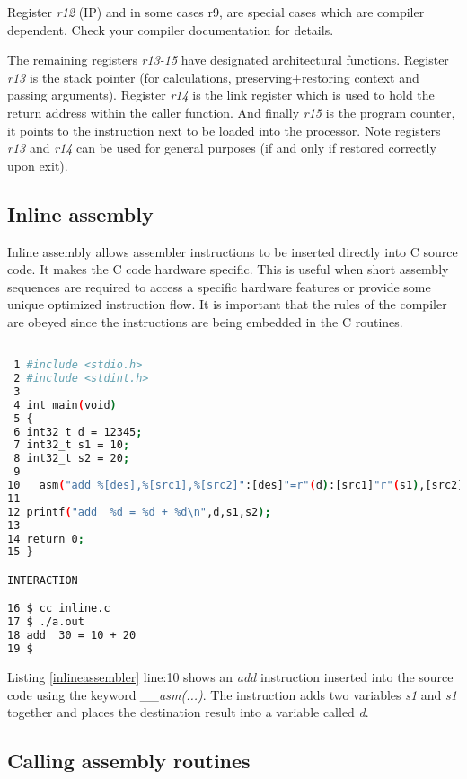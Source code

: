 Register \textit{r12} (IP) and in some cases r9, are special cases which are compiler dependent. Check your compiler documentation for details. 

The remaining registers \textit{r13-15} have designated architectural functions. Register \textit{r13} is the stack pointer (for calculations, preserving+restoring context and passing arguments). Register \textit{r14} is the link register which is used to hold the return address within the caller function. And finally \textit{r15} is the program counter, it points to the instruction next to be loaded into the processor. Note registers \textit{r13} and \textit{r14} can be used for general purposes (if and only if restored correctly upon exit).

\subsection{Inline assembly} \label{inlineass} 

Inline assembly allows assembler instructions to be inserted directly into C source code. It makes the C code hardware specific. This is useful when short assembly sequences are required to access a specific hardware features or provide some unique optimized instruction flow. It is important that the rules of the compiler are obeyed since the instructions are being embedded in the C routines.

\begin{lstlisting}[language=bash,showstringspaces=false,caption={File: inline.c},captionpos=b,label=inlineassembler]

 1 #include <stdio.h>
 2 #include <stdint.h>
 3 
 4 int main(void)
 5 {
 6 int32_t d = 12345;
 7 int32_t s1 = 10;
 8 int32_t s2 = 20;
 9 
10 __asm("add %[des],%[src1],%[src2]":[des]"=r"(d):[src1]"r"(s1),[src2]"r"(s2));
11   
12 printf("add  %d = %d + %d\n",d,s1,s2);
13 
14 return 0;
15 }

INTERACTION

16 $ cc inline.c
17 $ ./a.out
18 add  30 = 10 + 20
19 $

\end{lstlisting}

Listing \ref{inlineassembler} line:10 shows an \textit{add} instruction inserted into the source code using the keyword \textit{\_\_asm(...)}. The instruction adds two variables \textit{s1} and \textit{s1} together and places the destination result into a variable called \textit{d}.
	
\subsection{Calling assembly routines} \label{callingass}

